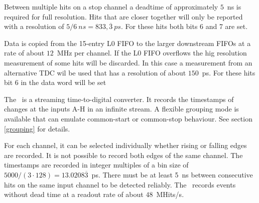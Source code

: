 {    Between multiple hits on a stop channel a deadtime of approximately $5$~ns is required for full resolution. 
    Hits that are closer together will only be reported with a resolution of $5/6~ns = 833,\overline{3}~ps$. For these hits both bits 6 and 7 are set.

    Data is copied from the 15-entry L0 FIFO to the larger downstream FIFOs at a rate of about $12$~MHz per channel. 
    If the L0 FIFO overflows the hig resolution measurement of some hits will be discarded. 
    In this case a measurement from an alternative TDC wil be used that has a resolution of about $150$~ps. 
    For these hits bit 6 in the data word will be set
} { %
    The \deviceName\ is a streaming time-to-digital converter. It records the timestamps of changes at the inputs A-H in an infinite stream. 
    A flexible grouping mode is available that can emulate common-start or common-stop behaviour. See section \ref{grouping} for details.

    For each channel, it can be selected individually whether rising or falling edges are recorded. It is not possible to record both edges of the same channel. 
    The timestamps are recorded in integer multiples of a bin size of $5000/(3\cdot 128) = 13.0208\overline{3}$~ps. 
    There must be at least 5~ns between consecutive hits on the same input channel to be detected reliably. 
    The \deviceName\ records events without dead time at a readout rate of about $48$~MHits/s.
}
